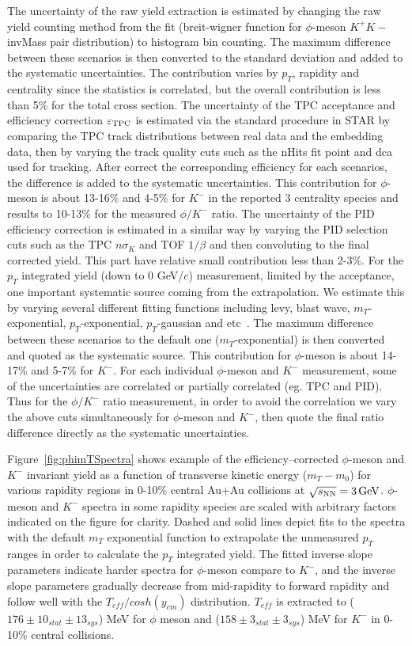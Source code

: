 \documentclass[%
 reprint,	
showpacs,
 amsmath,amssymb,
 aps,
 prc,
]{revtex4-1}
\begin{document}
The uncertainty of the raw yield extraction is estimated by changing the raw yield counting method from the fit (breit-wigner function for $\phi$-meson $K^+K-$ invMass pair distribution) to histogram bin counting. The maximum difference between these scenarios is then converted to the standard deviation and added to the systematic uncertainties. The contribution varies by $p_T$, rapidity and centrality since the statistics is correlated, but the overall contribution is less than 5\% for the total cross section. The uncertainty of the TPC acceptance and efficiency correction $\varepsilon_{\rm TPC}$ is estimated via the standard procedure in STAR by comparing the TPC track distributions between real data and the embedding data, then by varying the track quality cuts such as the nHits fit point and dca used for tracking. After correct the corresponding efficiency for each scenarios, the difference is added to the systematic uncertainties. This contribution for $\phi$-meson is about 13-16\% and 4-5\% for $K^-$ in the reported 3 centrality species and results to 10-13\% for the measured $\phi/K^-$ ratio. The uncertainty of the PID efficiency correction is estimated in a similar way by varying the PID selection cuts such as the TPC $n\sigma_{K}$ and TOF $1/\beta$ and then convoluting to the final corrected yield. This part have relative small contribution less than 2-3\%. For the $p_T$ integrated yield (down to 0 GeV/$c$) measurement, limited by the acceptance, one important systematic source coming from the extrapolation. We estimate this by varying several different fitting functions including levy, blast wave, $m_T$-exponential, $p_T$-exponential, $p_T$-gaussian and etc~\cite{PhysRevC.79.034909}. The maximum difference between these scenarios to the default one ($m_T$-exponential) is then converted and quoted as the systematic source. This contribution for $\phi$-meson is about 14-17\% and 5-7\% for $K^-$. For each individual $\phi$-meson and $K^-$ measurement, some of the uncertainties are correlated or partially correlated (eg. TPC and PID). Thus for the $\phi/K^-$ ratio measurement, in order to avoid the correlation we vary the above cuts simultaneously for $\phi$-meson and $K^-$, then quote the final ratio difference directly as the systematic uncertainties.


Figure~\ref{fig:phimTSpectra} shows example of the efficiency--corrected $\phi$-meson and $K^-$ invariant yield as a function of transverse kinetic energy ($m_T-m_0$) for various rapidity regions in 0-10\% central Au+Au collisions at ${\sqrt{s_{\rm NN}} = \rm{3\,GeV}}$. $\phi$-meson and $K^-$ spectra in some rapidity species are scaled with arbitrary factors indicated on the figure for clarity. Dashed and solid lines depict fits to the spectra with the default $m_T$ exponential function to extrapolate the unmeasured $p_T$ ranges in order to calculate the $p_T$ integrated yield. The fitted inverse slope parameters indicate harder spectra for $\phi$-meson compare to $K^-$, and the inverse slope parameters gradually decrease from mid-rapidity to forward rapidity and follow well with the $T_{eff}/cosh(y_{cm})$ distribution. $T_{eff}$ is extracted to ($176\pm10_{stat}\pm13_{sys}$) MeV for $\phi$ meson and ($158\pm3_{stat}\pm3_{sys}$) MeV for $K^-$ in 0-10\% central collisions.
\end{document}
